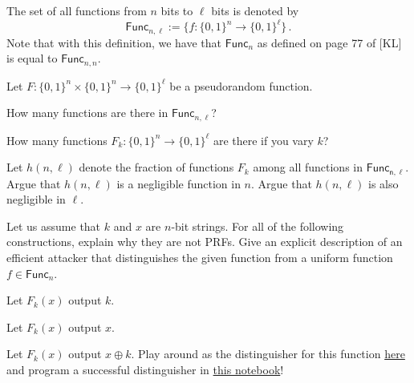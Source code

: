 \documentclass[a4paper,10pt,landscape,twocolumn]{scrartcl}
\begin{document}
\problems


\begin{exercise}
The set of all functions from $n$ bits to $\ell$ bits is denoted by
\[ \mathsf{Func}_{n,\ell} := \big\{f:\{0,1\}^n \rightarrow \{0,1\}^{\ell} \big\} \, .
\]
Note that with this definition, we have that $\mathsf{Func}_n$ as defined on page 77 of [KL] is equal to $\mathsf{Func}_{n,n}$.

Let $F:\{0,1\}^n \times \{0,1\}^n \rightarrow \{0,1\}^\ell$ be a pseudorandom function.

\begin{subex}
How many functions are there in $\mathsf{Func}_{n,\ell}$?
\end{subex}

\begin{subex}
How many functions $F_k:\{0,1\}^n \rightarrow \{0,1\}^\ell$ are there if you vary $k$?
\end{subex}

\begin{subex}
Let $h(n,\ell)$ denote the fraction of functions $F_k$ among all functions in $\mathsf{Func_{n,\ell}}$. Argue that $h(n, \ell)$ is a negligible function in $n$. Argue that $h(n,\ell)$ is also negligible in $\ell$.
\end{subex}

\end{exercise}


\begin{exercise}
Let us assume that $k$ and $x$ are $n$-bit strings. For all of the following constructions, explain why they are not PRFs. Give an explicit description of an efficient attacker that distinguishes the given function from a uniform function $f \in \mathsf{Func}_n$.

\begin{subex}
Let $F_k(x)$ output $k$.
\end{subex}

\begin{subex}
Let $F_k(x)$ output $x$.
\end{subex}

\begin{subex}
Let $F_k(x)$ output $x \oplus k$. Play around as the distinguisher for this function \href{https://staff.fnwi.uva.nl/j.m.czajkowski/game/prf.html}{here} and program a successful distinguisher in \href{https://colab.research.google.com/drive/1uCr-BvOARnlc3qAp2nam2FlxpQBUVMgS}{this notebook}!
\end{subex}

\end{exercise}
\end{document}
